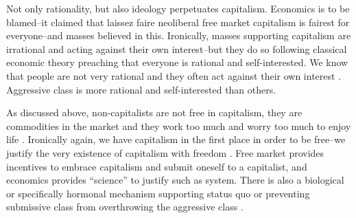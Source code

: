 \documentclass[11pt, letterpaper]{article}
\begin{document}
\begin{spacing}{2.0}
Not only rationality, but also ideology perpetuates capitalism. Economics is to be blamed--it claimed that
laissez faire neoliberal free market capitalism is fairest for everyone--and
masses believed in this. 
Ironically, masses supporting capitalism are irrational and acting against
their own interest--but they do so following classical
economic theory preaching that everyone is rational and self-interested. 
We know that people are not very rational and they often act against their own
interest \citep{akerlof10,ariely09,shiller15}. Aggressive class is more rational
and self-interested than others.

As discussed above, non-capitalists are not
free in capitalism, they are commodities in the market and they work too much
and worry too much to enjoy life \citep{aokJap14}. Ironically again, we
have capitalism in the first place in order to be free--we justify the very
existence of capitalism with freedom
\citep{hayek14,friedman09,glaeser11B}. Free market provides incentives to
embrace capitalism and submit oneself to a capitalist, and economics provides
``science'' to justify such as system. There is also a biological or
specifically hormonal mechanism supporting status quo or preventing submissive
class from overthrowing the aggressive class \citep{wood12}.




\end{spacing}
\end{document}
